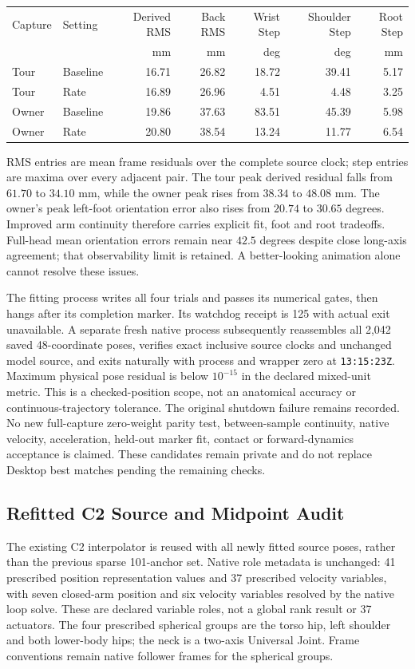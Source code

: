 \documentclass[11pt,a4paper]{article}
\begin{document}
\begin{center}
\begin{tabular}{llrrrrr}
\hline
Capture & Setting & Derived RMS & Back RMS & Wrist Step & Shoulder Step & Root Step\\
 & & mm & mm & deg & deg & mm\\
\hline
Tour & Baseline & 16.71 & 26.82 & 18.72 & 39.41 & 5.17\\
Tour & Rate & 16.89 & 26.96 & 4.51 & 4.48 & 3.25\\
Owner & Baseline & 19.86 & 37.63 & 83.51 & 45.39 & 5.98\\
Owner & Rate & 20.80 & 38.54 & 13.24 & 11.77 & 6.54\\
\hline
\end{tabular}
\end{center}
RMS entries are mean frame residuals over the complete source clock; step
entries are maxima over every adjacent pair. The tour peak derived residual
falls from $61.70$ to $34.10$ mm, while the owner peak rises from $38.34$ to
$48.08$ mm. The owner's peak left-foot orientation error also rises from
$20.74$ to $30.65$ degrees. Improved arm continuity therefore carries explicit
fit, foot and root tradeoffs. Full-head mean orientation errors remain near
$42.5$ degrees despite close long-axis agreement; that observability limit
is retained. A better-looking animation alone cannot resolve these issues.

The fitting process writes all four trials and passes its numerical gates,
then hangs after its completion marker. Its watchdog receipt is 125 with
actual exit unavailable. A separate fresh native process subsequently
reassembles all 2,042 saved 48-coordinate poses, verifies exact inclusive
source clocks and unchanged model source, and exits naturally with process
and wrapper zero at \texttt{13:15:23Z}. Maximum physical pose residual is
below $10^{-15}$ in the declared mixed-unit metric. This is a checked-position
scope, not an anatomical accuracy or continuous-trajectory tolerance.
The original shutdown failure remains recorded. No new full-capture
zero-weight parity test, between-sample continuity, native velocity,
acceleration, held-out marker fit, contact or forward-dynamics acceptance is
claimed. These candidates remain private and do not replace Desktop best
matches pending the remaining checks.

\subsection{Refitted C2 Source and Midpoint Audit}
The existing C2 interpolator is reused with all newly fitted source poses,
rather than the previous sparse 101-anchor set. Native role metadata is
unchanged: 41 prescribed position representation values and 37 prescribed
velocity variables, with seven closed-arm position and six velocity variables
resolved by the native loop solve. These are declared variable roles,
not a global rank result or 37 actuators. The four prescribed spherical
groups are the torso hip, left shoulder and both lower-body hips; the neck
is a two-axis Universal Joint. Frame conventions remain native follower
frames for the spherical groups.
\end{document}
